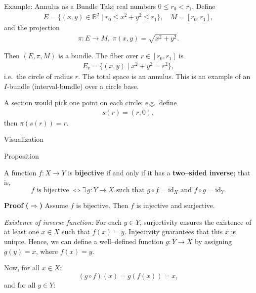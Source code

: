 \documentclass[11pt,aspectratio=43,ignorenonframetext,t]{beamer}
\newcounter{example_number} %
\begin{document}
\begin{frame}{Example: Annulus as a Bundle}
Take real numbers \(0 \le r_0 < r_1\). Define
\begin{align*}
E = \{ (x,y) \in \mathbb{R}^2 \mid r_0 \le x^2 + y^2 \le r_1 \}, \quad
M = [r_0, r_1],
\end{align*}
and the projection
\begin{align*}
\pi: E \to M,\; \pi(x,y) = \sqrt{x^2 + y^2}.
\end{align*}

Then \((E, \pi, M)\) is a bundle. The fiber over \(r\in [r_0,r_1]\) is
\begin{align*}
E_r = \{ (x,y) \mid x^2 + y^2 = r^2 \},
\end{align*}
i.e.\ the circle of radius \(r\). The total space is an annulus. This is an example of an \(I\)-bundle (interval-bundle) over a circle base.

A section would pick one point on each circle: e.g.\ define 
\begin{align*}
s(r) = (r, 0),
\end{align*}
then \(\pi(s(r)) = r\).
\end{frame}

\begin{frame}{Visualization}
    \begin{center}
\end{center}
\end{frame}

\begin{frame}{Proposition}
\vspace{-0.3cm}
\begin{block}{}  
A function \( f : X \to Y \) is \textbf{bijective} if and only if it has a \textbf{two–sided inverse}; that is,
\[
f \text{ is bijective } \iff \exists\, g : Y \to X \text{ such that } 
g \circ f = \mathrm{id}_X \text{ and } f \circ g = \mathrm{id}_Y.
\]
\end{block}

\textbf{Proof}
\textbf{($\Rightarrow$)}  
Assume \(f\) is bijective.  
Then \(f\) is injective and surjective.

\emph{Existence of inverse function:}  
For each \(y \in Y\), surjectivity ensures the existence of at least one \(x \in X\) such that \(f(x)=y\).  
Injectivity guarantees that this \(x\) is unique.  
Hence, we can define a well–defined function \(g : Y \to X\) by assigning \(g(y)=x\), where \(f(x)=y.\)

Now, for all \(x \in X\):
\[
(g \circ f)(x) = g(f(x)) = x,
\]
and for all \(y \in Y\):
\end{frame}
\end{document}
